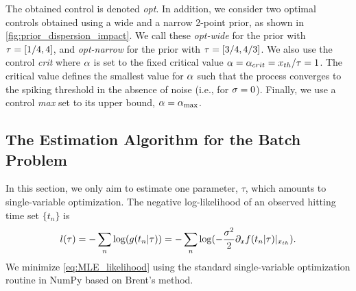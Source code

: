 The obtained control is denoted  {\em opt}. In addition, we consider 
two optimal controls obtained using a wide and a narrow 2-point prior, as
shown in \cref{fig:prior_dispersion_impact}. We call these {\em opt-wide} for the
prior with ${ \tau } =  [1/4, 4]$, and {\em opt-narrow} for the prior with  ${ \tau } =  
[3/4, 4/3]$.  We also use the control {\em crit} where $\alpha$ is set to the fixed critical value 
$\alpha = \alpha_{crit} = { x_{th} }/{ \tau } = 1$. The critical value defines the smallest
value for $\alpha$ such that the process converges to the spiking threshold in the
absence of noise (i.e., for $\sigma=0$). Finally, we use a control {\em
  max} set to its upper
bound, $\alpha = { \alpha_{\textrm{max}} }$.

\subsection{The Estimation Algorithm for the Batch Problem}

In this section, we only aim to estimate one parameter, $\tau$, which
amounts to single-variable optimization. The negative log-likelihood of an
observed hitting time set $\{t_n\}$ is
\begin{equation}
l({ \tau }) = - \sum_n \log ( g(t_n | { \tau }) ) =  - \sum_n \log ( -\frac{\sigma^2}2 {\partial}_x
f(t_n | { \tau }) |_{{ x_{th} }} ).
\label{eq:MLE_likelihood}
\end{equation}
We minimize \cref{eq:MLE_likelihood} using the standard single-variable
optimization routine in NumPy based on Brent's method.

% 

